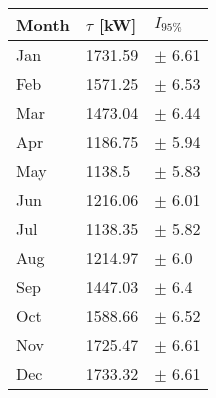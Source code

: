 \begin{tabular}{lll}
\toprule
Month & $\tau$ [kW] &   $I_{95\%}$ \\
\midrule
  Jan &     1731.59 &   $\pm$ 6.61 \\
  Feb &     1571.25 &   $\pm$ 6.53 \\
  Mar &     1473.04 &   $\pm$ 6.44 \\
  Apr &     1186.75 &   $\pm$ 5.94 \\
  May &      1138.5 &   $\pm$ 5.83 \\
  Jun &     1216.06 &   $\pm$ 6.01 \\
  Jul &     1138.35 &   $\pm$ 5.82 \\
  Aug &     1214.97 &    $\pm$ 6.0 \\
  Sep &     1447.03 &    $\pm$ 6.4 \\
  Oct &     1588.66 &   $\pm$ 6.52 \\
  Nov &     1725.47 &   $\pm$ 6.61 \\
  Dec &     1733.32 &   $\pm$ 6.61 \\
\bottomrule
\end{tabular}
